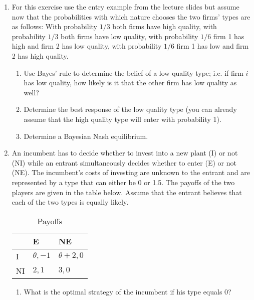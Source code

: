 \documentclass[a4paper,12pt]{article}
\begin{document}
\begin{enumerate}[resume]
\item For this exercise use the entry example from the lecture slides but assume now that the probabilities with which nature chooses the two firms' types are as follows: With probability $1/3$ both firms have high quality, with probability $1/3$ both firms have low quality, with probability $1/6$ firm 1 has high and firm 2 has low quality, with probability $1/6$ firm 1 has low and firm 2 has high quality.
  \begin{enumerate}
  \item Use Bayes' rule to determine the belief of a low quality type; i.e. if firm $i$ has low quality, how likely is it that the other firm has low quality as well?
  \item Determine the best response of the low quality type (you can already assume that the high quality type will enter with probability 1).
  \item Determine a Bayesian Nash equilibrium.
  \end{enumerate}
\item An incumbent has to decide whether to invest into a new plant (I) or not (NI) while an entrant simultaneously decides whether to enter (E) or not (NE). The incumbent's costs of investing are unknown to the entrant and are represented by a type that can either be 0 or 1.5. The payoffs of the two players are given in the table below. Assume that the entrant believes that each of the two types is equally likely. 
  \begin{table}[htbp]
\caption{Payoffs}
\centering
\begin{tabular}{l|ll}
 & E & NE\\
\hline
I & \(\theta,-1\) & \(\theta+2,0\)\\
NI & $2,1$ & $3,0$\\
\end{tabular}
\end{table}
\begin{enumerate}
\item What is the optimal strategy of the incumbent if his type equals 0?

\end{enumerate}
\end{enumerate}
\end{document}
